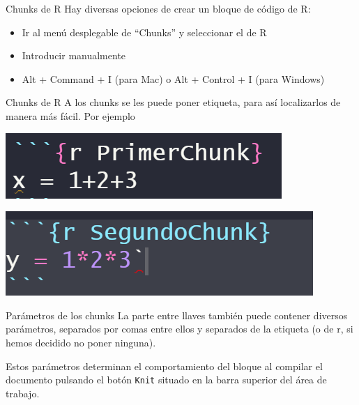 \documentclass[
  ignorenonframetext,
  aspectratio=169]{beamer}
\providecommand{\tightlist}{%
  \setlength{\itemsep}{0pt}\setlength{\parskip}{0pt}}
\begin{document}
\begin{frame}{Chunks de R}
\protect\hypertarget{chunks-de-r-1}{}
Hay diversas opciones de crear un bloque de código de R:

\begin{itemize}
\tightlist
\item
  Ir al menú desplegable de ``Chunks'' y seleccionar el de R
\item
  Introducir manualmente
\item
  Alt + Command + I (para Mac) o Alt + Control + I (para Windows)
\end{itemize}
\end{frame}

\begin{frame}{Chunks de R}
\protect\hypertarget{chunks-de-r-2}{}
A los chunks se les puede poner etiqueta, para así localizarlos de
manera más fácil. Por ejemplo

\includegraphics[width=0.6\linewidth]{Imgs/primer_chunk}

\includegraphics[width=0.6\linewidth]{Imgs/segundo_chunk}
\end{frame}

\begin{frame}[fragile]{Parámetros de los chunks}
\protect\hypertarget{paruxe1metros-de-los-chunks}{}
La parte entre llaves también puede contener diversos parámetros,
separados por comas entre ellos y separados de la etiqueta (o de r, si
hemos decidido no poner ninguna).

Estos parámetros determinan el comportamiento del bloque al compilar el
documento pulsando el botón \texttt{Knit} situado en la barra superior
del área de trabajo.
\end{frame}
\end{document}
